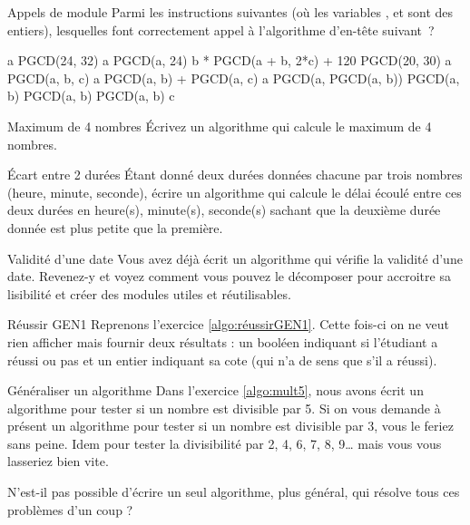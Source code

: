 	\begin{Exercice}{Appels de module}
		Parmi les instructions suivantes (où les variables
		,  et 
		sont des entiers), lesquelles font correctement appel 
		à l'algorithme d’en-tête suivant~?
	
		\begin{LDA}
		\end{LDA}
	
		\begin{LDA}
		\Stmt [1] a \Gets PGCD(24, 32)
		\Stmt [2] a \Gets PGCD(a, 24)
		\Stmt [3] b  * PGCD(a + b, 2*c) + 120
		\Stmt [4] PGCD(20, 30)
		\Stmt [5] a \Gets PGCD(a, b, c)
		\Stmt [6] a \Gets PGCD(a, b) + PGCD(a, c)
		\Stmt [7] a \Gets PGCD(a, PGCD(a, b))
		\Stmt [8]  PGCD(a, b)
		\Stmt [9]  PGCD(a, b)
		\Stmt [10] PGCD(a, b) \Gets c
		\end{LDA}
	\end{Exercice}
	
	\begin{Exercice}{Maximum de 4 nombres}
		Écrivez un algorithme qui calcule le maximum de 4 nombres.
	\end{Exercice}

	\begin{Exercice}{Écart entre 2 durées}
		Étant donné deux durées données chacune par trois
		nombres (heure, minute, seconde),
		écrire un algorithme qui calcule
		le délai écoulé entre ces deux durées en heure(s), minute(s),
		seconde(s) sachant que la deuxième durée donnée 
		est plus petite que la première.
	\end{Exercice}
	
	\begin{Exercice}{Validité d'une date}
		Vous avez déjà écrit un algorithme
		qui vérifie la validité d'une date.
		Revenez-y et voyez comment
		vous pouvez le décomposer
		pour accroitre sa lisibilité
		et créer des modules utiles et réutilisables.
	\end{Exercice}

	\begin{Exercice}{Réussir GEN1}
		Reprenons l'exercice \vref{algo:réussirGEN1}.
		Cette fois-ci on ne veut rien afficher
		mais fournir deux résultats :
		un booléen indiquant si l'étudiant a réussi ou pas
		et un entier indiquant sa cote (qui n'a de sens que s'il a réussi). 
	\end{Exercice}

	\begin{Exercice}{Généraliser un algorithme}
		Dans l'exercice \vref{algo:mult5},
		nous avons écrit un algorithme 
		pour tester si un nombre est divisible par 5.
		Si on vous demande à présent
		un algorithme pour tester si un nombre est divisible par 3,
		vous le feriez sans peine.
		Idem pour tester la divisibilité par 2, 4, 6, 7, 8, 9\dots{}
		mais vous vous lasseriez bien vite.
		
		N'est-il pas possible d'écrire un seul algorithme,
		plus général, qui résolve tous ces problèmes d'un coup ?  
	\end{Exercice}
	
